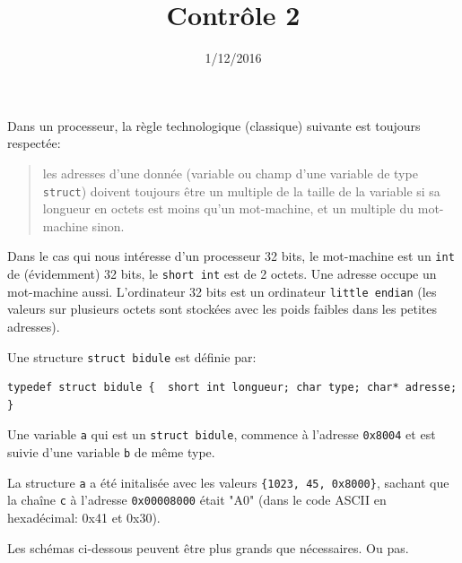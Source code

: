 \documentclass[a4paper]{iutvexam}
\title{Contrôle 2}
\date{1/12/2016}
\begin{document}
\begin{questions}

  Dans un processeur, la règle technologique (classique) suivante est
  toujours respectée:
  \begin{quote}
    les adresses d'une donnée (variable ou champ d'une variable de type
    \texttt{struct}) doivent toujours être un multiple de la taille de
    la variable si sa longueur en octets est moins qu'un mot-machine, et
    un multiple du mot-machine sinon.
  \end{quote}

  Dans le cas qui nous intéresse d'un processeur 32 bits, le mot-machine
  est un \texttt{int} de (évidemment) 32 bits, le \texttt{short int} est
  de 2 octets. Une adresse occupe un mot-machine aussi. L'ordinateur 32
  bits est un ordinateur \texttt{little endian} (les valeurs sur
  plusieurs octets sont stockées avec les poids faibles dans les petites
  adresses).

  Une structure \texttt{struct bidule} est définie par:

\begin{verbatim}
typedef struct bidule {  short int longueur; char type; char* adresse; }
\end{verbatim}

  Une variable \texttt{a} qui est un \texttt{struct bidule}, commence à l'adresse \texttt{0x8004} et est suivie d'une variable \texttt{b} de même type.


  La structure \texttt{a} a été initalisée avec les valeurs \verb|{1023, 45, 0x8000}|, sachant que la chaîne \texttt{c} à l'adresse \texttt{0x00008000} était "A0" (dans le code ASCII en hexadécimal: 0x41 et 0x30).

  Les schémas ci-dessous peuvent être plus grands que nécessaires. Ou pas.

\end{questions}
\end{document}
